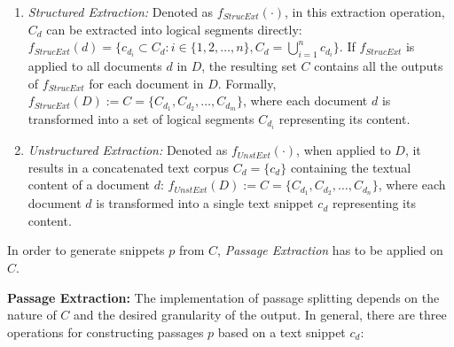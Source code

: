 \begin{enumerate}
    \item \textit{Structured Extraction:} Denoted as $f_{StrucExt}(\cdot)$, in this extraction operation, $C_d$ can be extracted into logical segments directly: $f_{StrucExt}(d) = \{c_{d_i} \subset C_d : i \in \{1, 2, \ldots, n\}, C_d = \bigcup_{i=1}^{n} c_{d_i}\}$. If $f_{StrucExt}$ is applied to all documents $d$ in $D$, the resulting set $C$ contains all the outputs of $f_{StrucExt}$ for each document in $D$. Formally, $f_{StrucExt}(D) := C = \{C_{d_1}, C_{d_2}, \dots, C_{d_m}\}$, where each document $d$ is transformed into a set of logical segments $C_{d_i}$ representing its content.
    \item \textit{Unstructured Extraction:} Denoted as $f_{UnstExt}(\cdot)$, when applied to $D$, it results in a concatenated text corpus $C_d = \{c_d\} $ containing the textual content of a document $d$: $f_{UnstExt}(D) := C = \{C_{d_1}, C_{d_2}, \dots, C_{d_n}\}$, where each document $d$ is transformed into a single text snippet $c_d$ representing its content.
\end{enumerate}

In order to generate snippets $p$ from $C$, \textit{Passage Extraction} has to be applied on $C$.

\vspace{\baselineskip} %

\noindent\textbf{Passage Extraction:} The implementation of passage splitting depends on the nature of $C$ and the desired granularity of the output. In general, there are three operations for constructing passages $p$ based on a text snippet $c_d$:

